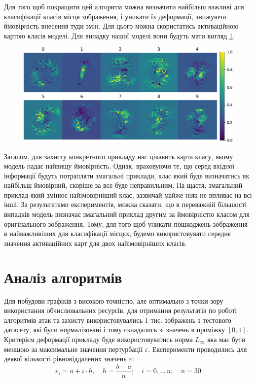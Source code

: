 \documentclass[a4paper,14pt]{extreport}
\begin{document}
	Для того щоб покращити цей алгоритм можна визначити найбільш важливі для класифікації класів місця зображення, і уникати їх деформації, знижуючи ймовірність внесення туди змін. Для цього можна скористатись активаційною картою класів моделі. Для випадку нашої моделі вони будуть мати вигляд \ref{fig:classactivationmap}.
	\begin{figure}[h]
		\centering
		\includegraphics[width=\textwidth]{resources/classactivationmap.pdf}
		\caption{}
		\label{fig:classactivationmap}
	\end{figure}

	Загалом, для захисту конкретного прикладу нас цікавить карта класу, якому модель надає найвищу ймовірність. Однак, враховуючи те, що серед вхідної інформації будуть потрапляти змагальні приклади, клас який буде визначатись як найбільш ймовірний, скоріше за все буде неправильним. На щастя, змагальний приклад який змінює найімовірніший клас, зазвичай майже ніяк не впливає на всі інші. За результатами експериментів, можна сказати, що в переважній більшості випадків модель визначає змагальний приклад другим за ймовірністю класом для оригінального зображення. Тому, для того щоб уникати пошкоджень зображення в найважливіших для класифікації місцях, будемо використовувати середнє значення активаційних карт для двох найімовірніших класів.
	

	\chapter{Аналіз алгоритмів}
	Для побудови графіків з високою точністю, але оптимально з точки зору використання обчислювальних ресурсів, для отримання результатів по роботі алгоритмів атак та захисту використовувались 1 тис. зображень з тестового датасету, які були нормалізовані і тому складались зі значень в проміжку $[0, 1]$. Критерієм деформації прикладу буде використовуватись норма $L_{\infty}$ яка має бути меншою за максимальне значення пертурбації $\varepsilon$. Експерименти проводились для деякої кількості рівновіддалених значень $\varepsilon$:
	$$\varepsilon_{i}=a + i \cdot h, \quad h=\frac{b - a}{n}; \quad i=0,..,n; \quad n=30$$
\end{document}
